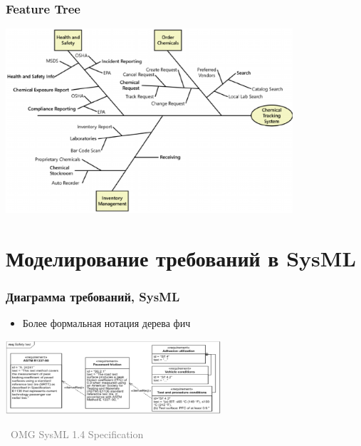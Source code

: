 \documentclass[xetex,mathserif,serif]{beamer}
\newcommand{\attribution}[1] {
	\vspace{-5mm}\begin{flushright}\begin{scriptsize}\textcolor{gray}{\textcopyright\, #1}\end{scriptsize}\end{flushright}
}
\begin{document}
	\begin{frame}
		\frametitle{Feature Tree}
		\begin{center}
			\includegraphics[width=0.8\textwidth]{featureTree.png}
		\end{center}
	\end{frame}

	\section{Моделирование требований в SysML}

	\begin{frame}
		\frametitle{Диаграмма требований, SysML}
		\begin{itemize}
			\item Более формальная нотация дерева фич
		\end{itemize}
		\begin{center}
			\includegraphics[width=0.6\textwidth]{sysMlRequirementDiagram.png}
			\attribution{OMG SysML 1.4 Specification}
		\end{center}
	\end{frame}
\end{document}
